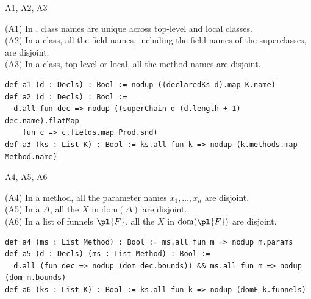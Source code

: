 \begin{cmp}{A1, A2, A3}
\begin{paperside}
(A1) In \decls, class names are unique across top-level and local classes.\\
(A2) In a class, all the field names, including the field names of the superclasses, are disjoint.\\
(A3) In a class, top-level or local, all the method names are disjoint.
\end{paperside}
\begin{leanside}
\begin{lstlisting}[style=leanside]
def a1 (d : Decls) : Bool := nodup ((declaredKs d).map K.name)
def a2 (d : Decls) : Bool :=
  d.all fun dec => nodup ((superChain d (d.length + 1) dec.name).flatMap
    fun c => c.fields.map Prod.snd)
def a3 (ks : List K) : Bool := ks.all fun k => nodup (k.methods.map Method.name)
\end{lstlisting}
\end{leanside}
\end{cmp}

\begin{cmp}{A4, A5, A6}
\begin{paperside}
(A4) In a method, all the parameter names $x_1,\ldots,x_n$ are disjoint.\\
(A5) In a $\Delta$, all the $X$ in $\mathrm{dom}(\Delta)$ are disjoint.\\
(A6) In a list of funnels $\pl{F}$, all the $X$ in $\mathrm{dom}(\pl{F})$ are disjoint.
\end{paperside}
\begin{leanside}
\begin{lstlisting}[style=leanside]
def a4 (ms : List Method) : Bool := ms.all fun m => nodup m.params
def a5 (d : Decls) (ms : List Method) : Bool :=
  d.all (fun dec => nodup (dom dec.bounds)) && ms.all fun m => nodup (dom m.bounds)
def a6 (ks : List K) : Bool := ks.all fun k => nodup (domF k.funnels)
\end{lstlisting}
\end{leanside}
\end{cmp}

